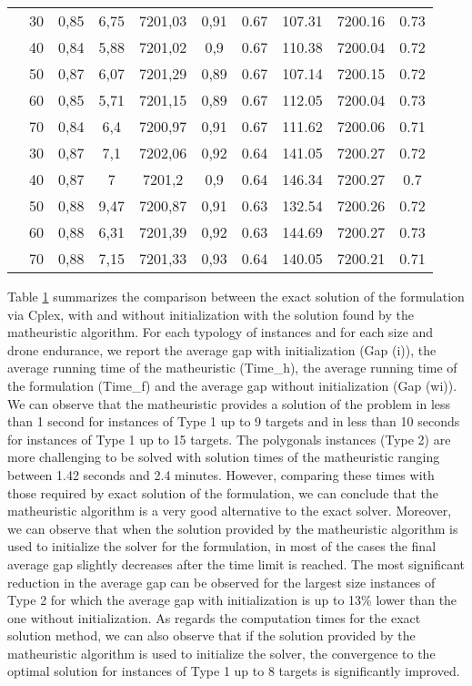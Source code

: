 \begin{table}[!h]
\begin{tabular}{|c|c|c c c c|c c c c|}
\hline\multirow{5}{*}{\midrule 14} 
& 30 &  0,85  &	6,75 &	7201,03 &	0,91 &	0.67 &	107.31 &	7200.16 &	0.73\\
& 40 &	0,84 &	5,88 &	7201,02 &	0,9  &  0.67 &	110.38 &	7200.04 &	0.72\\
& 50 &	0,87 &	6,07 &	7201,29 &	0,89 &	0.67 &	107.14 &	7200.15 &	0.72\\
& 60 &	0,85 &	5,71 &	7201,15 &	0,89 &	0.67 &	112.05 &	7200.04 &	0.73\\
& 70 &	0,84 &	6,4 &	7200,97 &	0,91 &	0.67 &	111.62 &	7200.06 &	0.71\\
\hline
\multirow{5}{*}{\midrule 15} 
& 30 &	0,87 &	7,1 &	7202,06 & 0,92 &	0.64 &	141.05 &	7200.27 &	0.72\\
& 40 &	0,87 &	7   &	7201,2  & 0,9  &	0.64 &	146.34 &	7200.27 &	0.7\\
& 50 &	0,88 &	9,47 &	7200,87 & 0,91 &	0.63 &	132.54 &	7200.26 &	0.72\\
& 60 &	0,88 &	6,31 &	7201,39 & 0,92 &	0.63 &	144.69 &	7200.27 &	0.73\\
& 70 &	0,88 &	7,15 &	7201,33 & 0,93 &	0.64 &	140.05 &	7200.21 &	0.71\\
\hline
\end{tabular}
\label{table:tab2}
\end{table}


Table \ref{table:tab2} summarizes the comparison between the exact solution of the formulation via Cplex, with and without initialization with the solution found by the matheuristic algorithm. For each typology of instances and for each size and drone endurance, we report the average gap with initialization (Gap (i)), the average running time of the matheuristic (Time\_h), the average running time of the formulation (Time\_f) and the average gap without initialization (Gap (wi)). We can observe that the matheuristic  provides a solution of the problem in less than 1 second for instances of Type 1 up to 9 targets and in less than 10 seconds for instances of Type 1 up to 15 targets. The polygonals instances (Type 2) are more challenging to be solved with solution times of the matheuristic ranging between 1.42 seconds and 2.4 minutes. However, comparing these times with those required by exact solution of the formulation, we can conclude that the matheuristic algorithm is a very good alternative to the exact solver. Moreover, we can observe that when the solution provided by the matheuristic algorithm is used to initialize the solver for the formulation, in most of the cases the final average gap slightly decreases after the time limit is reached. The most significant reduction in the average gap can be observed for the largest size instances of Type 2 for which the average gap with initialization is up to 13$\%$ lower than the one without initialization. As regards the computation times for the exact solution method, we can also observe that if the solution provided by the matheuristic algorithm is used to initialize the solver, the convergence to the optimal solution for instances of Type 1 up to 8 targets is significantly improved.




